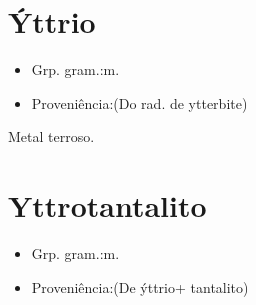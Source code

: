 \section{Ýttrio}
\begin{itemize}
\item {Grp. gram.:m.}
\end{itemize}
\begin{itemize}
\item {Proveniência:(Do rad. de \textunderscore ytterbite\textunderscore )}
\end{itemize}
Metal terroso.
\section{Yttrotantalito}
\begin{itemize}
\item {Grp. gram.:m.}
\end{itemize}
\begin{itemize}
\item {Proveniência:(De \textunderscore ýttrio\textunderscore  + \textunderscore tantalito\textunderscore )}
\end{itemize}
